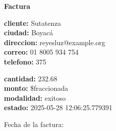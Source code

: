 \documentclass{article}
\begin{document}
\begin{center}
    {\LARGE \textbf{Factura}}\\[1cm]
\end{center}

\textbf{cliente:} Sutatenza \\
\textbf{ciudad:} Boyacá \\
\textbf{direccion:} reyesluz@example.org \\
\textbf{correo:} 01 8005 934 754 \\
\textbf{telefono:} 375 \\

\vspace{0.5cm}

\textbf{cantidad:} 232.68 \\
\textbf{monto:} \$fraccionada \\
\textbf{modalidad:} exitoso \\
\textbf{estado:} 2025-05-28 12:06:25.779391 \\

\vspace{1cm}

Fecha de la factura: 
\end{document}
